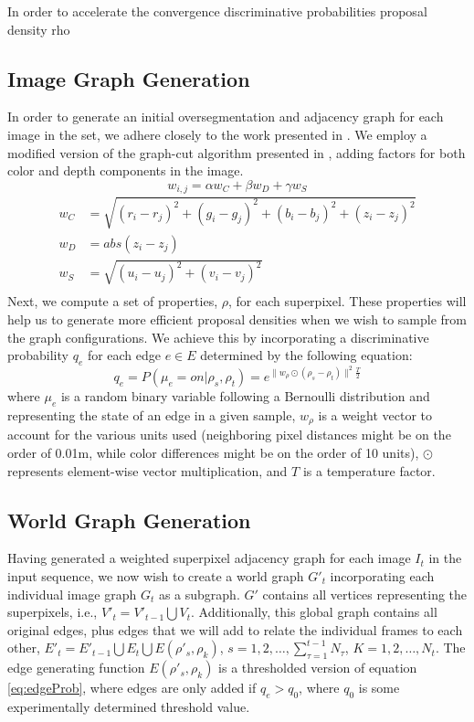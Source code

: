 \documentclass[10pt,letterpaper]{article}
\begin{document}
	
	\cite{metropolis1953equation}
	
	
	In order to accelerate the convergence
	\cite{barbu2005generalizing}
	discriminative probabilities
	proposal density
	rho

\subsection{Image Graph Generation}
	In order to generate an initial oversegmentation and adjacency graph for each image in the set, we adhere closely to the work presented in \cite{Erdogan12crv}. We employ a modified version of the graph-cut algorithm presented in \cite{felzenszwalb2004efficient}, adding factors for both color and depth components in the image.
\begin{equation}
w_{i,j}=\alpha w_C + \beta w_D + \gamma w_S
\end{equation}
\begin{align*}
w_C&=\sqrt{(r_i-r_j)^2+(g_i-g_j)^2+(b_i-b_j)^2+(z_i-z_j)^2} \\
w_D&=abs(z_i-z_j) \\
w_S&=\sqrt{(u_i-u_j)^2+(v_i-v_j)^2} \\
\end{align*}
	Next, we compute a set of properties, $\rho$, for each superpixel. These properties will help us to generate more efficient proposal densities when we wish to sample from the graph configurations. We achieve this by incorporating a discriminative probability $q_e$ for each edge $e\in{E}$ determined by the following equation: 
\begin{equation}
	q_e=P(\mu_e=on|\rho_s,\rho_t)=e^{\|w_\rho\odot(\rho_s-\rho_t)\|^2\frac{T}{2}}
	\label{eq:edgeProb}
\end{equation}
where $\mu_e$ is a random binary variable following a Bernoulli distribution and representing the state of an edge in a given sample, $w_\rho$ is a weight vector to account for the various units used (neighboring pixel distances might be on the order of 0.01m, while color differences might be on the order of 10 units), $\odot$ represents element-wise vector multiplication, and $T$ is a temperature factor.
	


\subsection{World Graph Generation}
	Having generated a weighted superpixel adjacency graph for each image $I_t$ in the input sequence, we now wish to create a world graph $G'_t$ incorporating each individual image graph $G_t$ as a subgraph. $G'$ contains all vertices representing the superpixels, i.e., $V'_t=V'_{t-1}{\bigcup}V_t$. Additionally, this global graph contains all original edges, plus edges that we will add to relate the individual frames to each other, $E'_t=E'_{t-1}{\bigcup}E_t{\bigcup}E(\rho'_s,\rho_k)$,
 $s=1,2,\ldots,\sum_{\tau=1}^{t-1}{N_\tau}$, 
 $K=1,2,\ldots,N_t$.
	The edge generating function $E(\rho'_s,\rho_k)$ is a thresholded version of equation \ref{eq:edgeProb}, where edges are only added if $q_e>q_0$, where $q_0$ is some experimentally determined threshold value.
	
\end{document}
